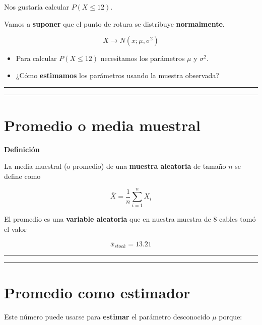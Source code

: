 \documentclass[
]{book}
\begin{document}
Nos gustaría calcular \(P(X \leq 12)\).

Vamos a \textbf{suponer} que el punto de rotura se distribuye \textbf{normalmente}.

\[X \rightarrow N(x; \mu, \sigma^2)\]

\begin{itemize}
\item
  Para calcular \(P(X \leq 12)\) necesitamos los parámetros \(\mu\) y \(\sigma^2\).
\item
  ¿Cómo \textbf{estimamos} los parámetros usando la muestra observada?
\end{itemize}

\begin{center}\rule{0.5\linewidth}{0.5pt}\end{center}

\begin{center}\rule{0.5\linewidth}{0.5pt}\end{center}

\hypertarget{promedio-o-media-muestral}{%
\section{Promedio o media muestral}\label{promedio-o-media-muestral}}

\textbf{Definición}

La media muestral (o promedio) de una \textbf{muestra aleatoria} de tamaño \(n\) se define como

\[\bar{X}=\frac{1}{n}\sum_{i=1}^n X_i\]

El promedio es una \textbf{variable aleatoria} que en nuestra muestra de \(8\) cables tomó el valor

\[\bar{x}_{stock}=13.21\]

\begin{center}\rule{0.5\linewidth}{0.5pt}\end{center}

\begin{center}\rule{0.5\linewidth}{0.5pt}\end{center}

\hypertarget{promedio-como-estimador}{%
\section{Promedio como estimador}\label{promedio-como-estimador}}

Este número puede usarse para \textbf{estimar} el parámetro desconocido \(\mu\) porque:
\end{document}
